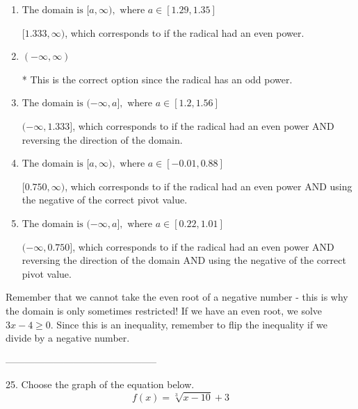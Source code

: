 \documentclass{article}[14pt]
\begin{document}
\begin{enumerate}[label=\Alph*.] 
\item $ \text{The domain is } [a, \infty), \text{   where } a \in [1.29, 1.35] $ 

 $[1.333, \infty)$, which corresponds to if the radical had an even power. 
\item $ (-\infty, \infty) $ 

 * This is the correct option since the radical has an odd power. 
\item $ \text{The domain is } (-\infty, a], \text{   where } a \in [1.2, 1.56] $ 

 $(-\infty, 1.333]$, which corresponds to if the radical had an even power AND reversing the direction of the domain. 
\item $ \text{The domain is } [a, \infty), \text{   where } a \in [-0.01, 0.88] $ 

 $[0.750, \infty)$, which corresponds to if the radical had an even power AND using the negative of the correct pivot value. 
\item $ \text{The domain is } (-\infty, a], \text{   where } a \in [0.22, 1.01] $ 

 $(-\infty, 0.750]$, which corresponds to if the radical had an even power AND reversing the direction of the domain AND using the negative of the correct pivot value. 
\end{enumerate} 
 
Remember that we cannot take the even root of a negative number - this is why the domain is only sometimes restricted! If we have an even root, we solve $3 x - 4 \geq 0$. Since this is an inequality, remember to flip the inequality if we divide by a negative number.

-----------------------------------------------

25. Choose the graph of the equation below.
$$ f(x) = \sqrt[3]{x - 10} + 3 $$ 
\end{document}
